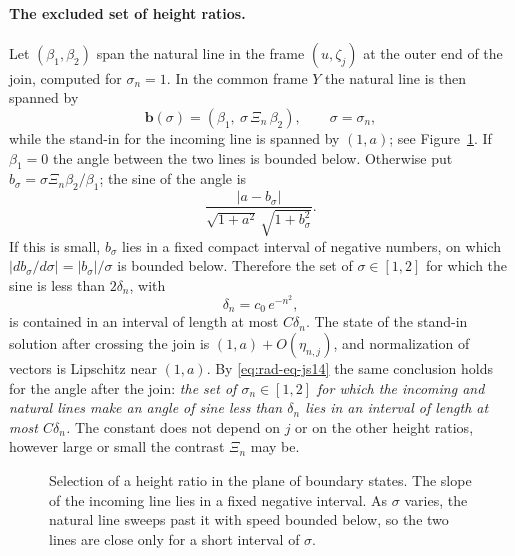 \paragraph{The excluded set of height ratios.}
Let $(\beta_1,\beta_2)$ span the natural line in the frame
$(u,\zeta_j)$ at the outer end of the join, computed for
$\sigma_n=1$. In the common frame $Y$ the natural line is then spanned
by
\[
 \mathbf b(\sigma)=(\beta_1,\ \sigma\,\Xi_n\,\beta_2),
 \qquad \sigma=\sigma_n ,
\]
while the stand-in for the incoming line is spanned by $(1,a)$; see
Figure~\ref{fig:height-selection}. If $\beta_1=0$ the angle between
the two lines is bounded below. Otherwise put
$b_\sigma=\sigma\Xi_n\beta_2/\beta_1$; the sine of the angle is
\[
 \frac{|a-b_\sigma|}{\sqrt{1+a^2}\,\sqrt{1+b_\sigma^2}} .
\]
If this is small, $b_\sigma$ lies in a fixed compact interval of
negative numbers, on which $|db_\sigma/d\sigma|=|b_\sigma|/\sigma$ is
bounded below. Therefore the set of $\sigma\in[1,2]$ for which the
sine is less than $2\delta_n$, with
\[
 \delta_n=c_0\,e^{-n^2},
\]
is contained in an interval of length at most $C\delta_n$. The state
of the stand-in solution after crossing the join is
$(1,a)+O(\eta_{n,j})$, and normalization of vectors is Lipschitz near
$(1,a)$. By \eqref{eq:rad-eq-js14} the same conclusion holds for the
angle after the join: \emph{the set of $\sigma_n\in[1,2]$ for which
the incoming and natural lines make an angle of sine less than
$\delta_n$ lies in an interval of length at most $C\delta_n$.} The
constant does not depend on $j$ or on the other height ratios,
however large or small the contrast $\Xi_n$ may be.

\begin{figure}[htbp]
\centering
{}
\caption{Selection of a height ratio in the plane of boundary states.
The slope of the incoming line lies in a fixed negative interval.
As $\sigma$ varies, the natural line sweeps past it with speed bounded
below, so the two lines are close only for a short interval of
$\sigma$.}
\label{fig:height-selection}
\end{figure}

